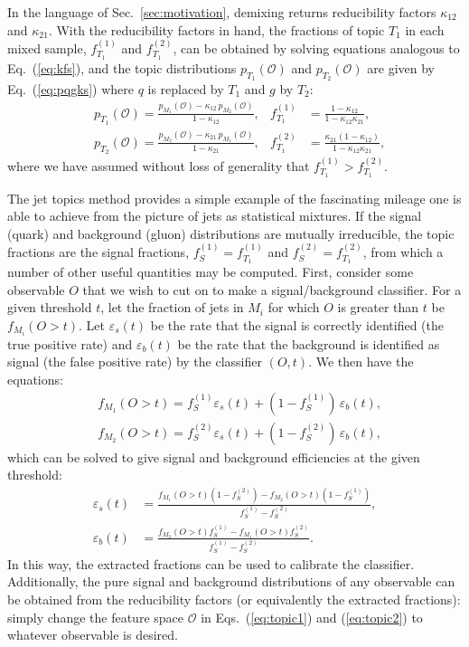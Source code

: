 \documentclass[letterpaper,11pt]{article}
\DeclareRobustCommand{\Sec}[1]{Sec.~\ref{#1}}
\DeclareRobustCommand{\Eq}[1]{Eq.~(\ref{#1})}
\DeclareRobustCommand{\Eqs}[2]{Eqs.~(\ref{#1}) and (\ref{#2})}
\renewcommand{\O}{\mathcal{O}}
\begin{document}
In the language of \Sec{sec:motivation}, demixing returns reducibility factors $\kappa_{12}$ and $\kappa_{21}$.
%
With the reducibility factors in hand, the fractions of topic $T_1$ in each mixed sample, $f_{T_1}^{(1)}$ and $f_{T_1}^{(2)}$, can be obtained by solving equations analogous to \Eq{eq:kfs}, and the topic distributions $p_{T_1}(\O)$ and $p_{T_2}(\O)$ are given by \Eq{eq:pqgks} where $q$ is replaced by $T_1$ and $g$ by $T_2$:
\begin{align}
\label{eq:topic1}
&p_{T_1}(\O)=\frac{p_{M_1}(\O)-\kappa_{12}\, p_{M_2}(\O)}{1-\kappa_{12}},&f_{T_1}^{(1)}&=\frac{1-\kappa_{12}}{1-\kappa_{12}\kappa_{21}},\\
&p_{T_2}(\O)=\frac{p_{M_2}(\O)-\kappa_{21}\, p_{M_1}(\O)}{1-\kappa_{21}},&f_{T_1}^{(2)}&=\frac{\kappa_{21}(1-\kappa_{12})}{1-\kappa_{12}\kappa_{21}},
\label{eq:topic2}
\end{align}
where we have assumed without loss of generality that $f_{T_1}^{(1)}>f_{T_1}^{(2)}$.


The jet topics method provides a simple example of the fascinating mileage one is able to achieve from the picture of jets as statistical mixtures.
%
If the signal (quark) and background (gluon) distributions are mutually irreducible, the topic fractions are the signal fractions, $f_S^{(1)}=f_{T_1}^{(1)}$ and $f_S^{(2)}=f_{T_1}^{(2)}$, from which a number of other useful quantities may be computed.
%
First, consider some observable $O$ that we wish to cut on to make a signal/background classifier. 
%
For a given threshold $t$, let the fraction of jets in $M_i$ for which $O$ is greater than $t$ be $f_{M_i}(O>t)$.
%
Let $\varepsilon_{s}(t)$ be the rate that the signal is correctly identified (the true positive rate) and $\varepsilon_{b}(t)$ be the rate that the background is identified as signal (the false positive rate) by the classifier $(O, t)$.
%
We then have the equations:
\begin{align}
\label{eq:calibrate}
&f_{M_1}(O>t)=f_S^{(1)}\varepsilon_s(t) + (1-f_S^{(1)})\, \varepsilon_b(t),\\
&f_{M_2}(O>t)=f_S^{(2)}\varepsilon_s(t) + (1-f_S^{(2)})\, \varepsilon_b(t),
\end{align}
which can be solved to give signal and background efficiencies at the given threshold:
\begin{align}
\label{eq:eps}
\varepsilon_s(t)&=\frac{f_{M_1}(O>t)(1-f_S^{(2)}) - f_{M_2}(O>t)(1-f_S^{(1)})}{f_S^{(1)} - f_S^{(2)}},\\
\label{eq:epb}
\varepsilon_b(t)&=\frac{f_{M_2}(O>t)f_S^{(1)} - f_{M_1}(O>t)f_S^{(2)}}{f_S^{(1)} - f_S^{(2)}}.
\end{align}
%
In this way, the extracted fractions can be used to calibrate the classifier.
%
Additionally, the pure signal and background distributions of any observable can be obtained from the reducibility factors (or equivalently the extracted fractions): simply change the feature space $\O$ in \Eqs{eq:topic1}{eq:topic2} to whatever observable is desired.
\end{document}
